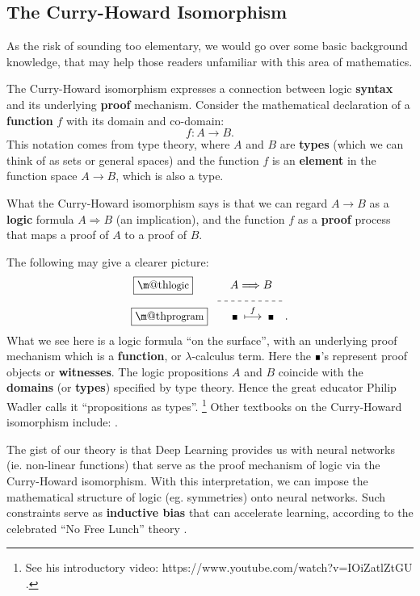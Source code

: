 \documentclass[orivec]{llncs}
\makeatletter
\newcommand{\witness}{\scalebox{0.6}{$\blacksquare$}}
\newcommand{\underdash}[1]{%
	\tikz[baseline=(toUnderline.base)]{
		\node[inner sep=1pt,outer sep=10pt] (toUnderline) {#1};
		\draw[dashed] ([yshift=-0pt]toUnderline.south west) -- ([yshift=-0pt]toUnderline.south east);
	}%
}%
\renewcommand{\boxed}[1]{\fbox{\m@th$\displaystyle\scalebox{0.9}{#1}$} \,}
\makeatother
\begin{document}
\subsection{The Curry-Howard Isomorphism}

As the risk of sounding too elementary, we would go over some basic background knowledge, that may help those readers unfamiliar with this area of mathematics.

The Curry-Howard isomorphism expresses a connection between logic \textbf{syntax} and its underlying \textbf{proof} mechanism.  Consider the mathematical declaration of a \textbf{function} $f$ with its domain and co-domain:
\begin{equation}
f: A \rightarrow B .
\end{equation}
This notation comes from type theory, where $A$ and $B$ are \textbf{types} (which we can think of as sets or general spaces) and the function $f$ is an \textbf{element} in the function space $A \rightarrow B$, which is also a type.

What the Curry-Howard isomorphism says is that we can regard $A \rightarrow B$ as a \textbf{logic} formula $A \Rightarrow B$ (an implication), and the function $f$ as a \textbf{proof} process that maps a proof of $A$ to a proof of $B$.

The following may give a clearer picture:
\begin{equation}
\label{eqn:Curry-Howard}
\begin{aligned}
\boxed{\mbox{logic}} \quad \quad \underdash{$A \Longrightarrow B$} & \\
\boxed{\mbox{program}} \quad \quad \witness \; \stackrel{f}{\longmapsto} \; \witness \hspace*{10pt} & .
\end{aligned}
\end{equation}
What we see here is a logic formula ``on the surface'', with an underlying proof mechanism which is a \textbf{function}, or $\lambda$-calculus term.  Here the $\witness$'s represent proof objects or \textbf{witnesses}.  The logic propositions $A$ and $B$ coincide with the \textbf{domains} (or \textbf{types}) specified by type theory.  Hence the great educator Philip Wadler calls it ``propositions as types''. \footnote{See his introductory video: https://www.youtube.com/watch?v=IOiZatlZtGU .} 
Other textbooks on the Curry-Howard isomorphism include: \cite{Sorensen2006} \cite{Simmons2000} \cite{Thompson1991}.

The gist of our theory is that Deep Learning provides us with neural networks (ie. non-linear functions) that serve as the proof mechanism of logic via the Curry-Howard isomorphism.  With this interpretation, we can impose the mathematical structure of logic (eg. symmetries) onto neural networks.  Such constraints serve as \textbf{inductive bias} that can accelerate learning, according to the celebrated ``No Free Lunch'' theory \cite{Wolpert1997} \cite{Alpaydin2020} \cite{Shalev-Shwartz2014}.
\end{document}

